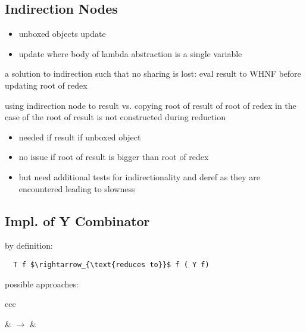 \documentclass[8pt]{extarticle}
\begin{document}
\begin{multicols*}{2}
\subsection{Indirection Nodes}

\begin{itemize}
\item unboxed objects update
\item update where body of lambda abstraction is a single variable
\end{itemize}

a solution to indirection such that no sharing is lost: eval result to WHNF before updating root of redex

using indirection node to result vs. copying root of result of root of redex in the case of the root of result is not constructed during reduction
\begin{itemize}
\item needed if result if unboxed object
\item no issue if root of result is bigger than root of redex
\item but need additional tests for indirectionality and deref as they are encountered leading to slowness
\end{itemize}

\subsection{Impl. of Y Combinator}
by definition:

\begin{lstlisting}
  T f $\rightarrow_{\text{reduces to}}$ f ( Y f)
\end{lstlisting}

possible approaches:

\begin{tblr}{ccc}
 &
$\rightarrow$ &
\end{tblr}


\end{multicols*}
\end{document}

